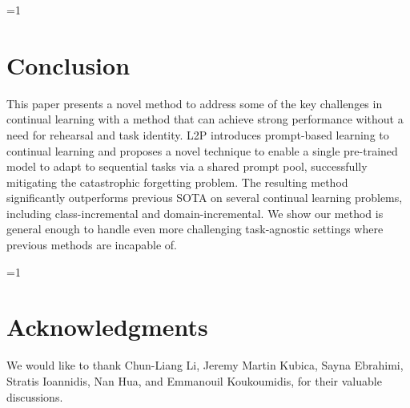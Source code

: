 \documentclass[10pt,twocolumn,letterpaper]{article}
\newcommand{\methodabbr}{L2P\xspace}
\newcounter{alphasect}
\def\alphainsection{0}
\let\oldsection=\section
\def\section{%
  \ifnum\alphainsection=1%
    \addtocounter{alphasect}{1}
  \fi%
\oldsection}%
\begin{document}
\section{Conclusion}
This paper presents a novel method to address some of the key challenges in continual learning with a method that can achieve strong performance without a need for rehearsal and task identity. \methodabbr introduces prompt-based learning to continual learning and proposes a novel technique to enable a single pre-trained model to adapt to sequential tasks via a shared prompt pool, successfully mitigating the catastrophic forgetting problem.
The resulting method significantly outperforms previous SOTA on several continual learning problems, including class-incremental and domain-incremental. We show our method is general enough to handle even more challenging task-agnostic settings where previous methods are incapable of. 

\section*{Acknowledgments}
We would like to thank Chun-Liang Li, Jeremy Martin Kubica, Sayna Ebrahimi, Stratis Ioannidis, Nan Hua, and Emmanouil Koukoumidis, for their valuable discussions.
\end{document}
